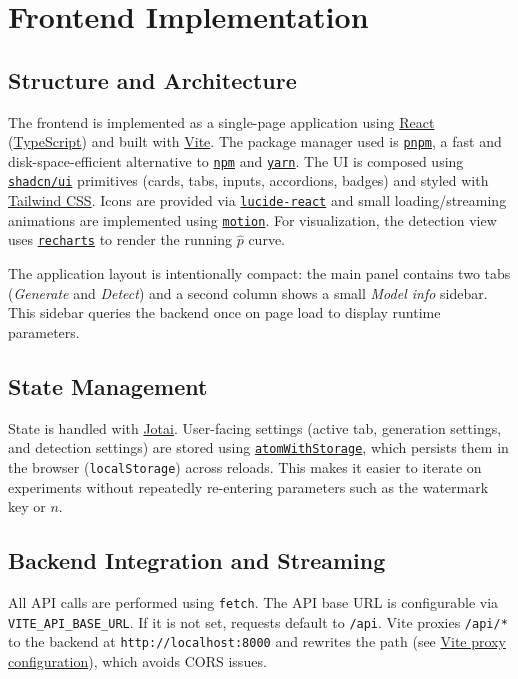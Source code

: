 \section{Frontend Implementation}

\subsection{Structure and Architecture}
The frontend is implemented as a single-page application using \href{https://react.dev}{React} (\href{https://www.typescriptlang.org}{TypeScript}) and built with \href{https://vitejs.dev}{Vite}. The package manager used is \href{https://pnpm.io}{\texttt{pnpm}}, a fast and disk-space-efficient alternative to \href{https://www.npmjs.com}{\texttt{npm}} and \href{https://yarnpkg.com}{\texttt{yarn}}.
The UI is composed using \href{https://ui.shadcn.com}{\texttt{shadcn/ui}} primitives (cards, tabs, inputs, accordions, badges) and styled with \href{https://tailwindcss.com}{Tailwind CSS}.
Icons are provided via \href{https://lucide.dev/guide/packages/lucide-react}{\texttt{lucide-react}} and small loading/streaming animations are implemented using \href{https://motion.dev}{\texttt{motion}}.
For visualization, the detection view uses \href{https://ui.shadcn.com/charts/area}{\texttt{recharts}} to render the running $\hat{p}$ curve.

The application layout is intentionally compact: the main panel contains two tabs (\emph{Generate} and \emph{Detect}) and a second column shows a small \emph{Model info} sidebar.
This sidebar queries the backend once on page load to display runtime parameters.

\subsection{State Management}
State is handled with \href{https://jotai.org}{Jotai}.
User-facing settings (active tab, generation settings, and detection settings) are stored using \href{https://jotai.org/docs/utilities/storage}{\texttt{atomWithStorage}}, which persists them in the browser (\texttt{localStorage}) across reloads.
This makes it easier to iterate on experiments without repeatedly re-entering parameters such as the watermark key or $n$.

\subsection{Backend Integration and Streaming}
All API calls are performed using \texttt{fetch}.
The API base URL is configurable via \texttt{VITE\_API\_BASE\_URL}. If it is not set, requests default to \texttt{/api}.
Vite proxies \texttt{/api/*} to the backend at \texttt{http://localhost:8000} and rewrites the path (see \href{https://vitejs.dev/config/server-options.html#server-proxy}{Vite proxy configuration}), which avoids CORS issues.


